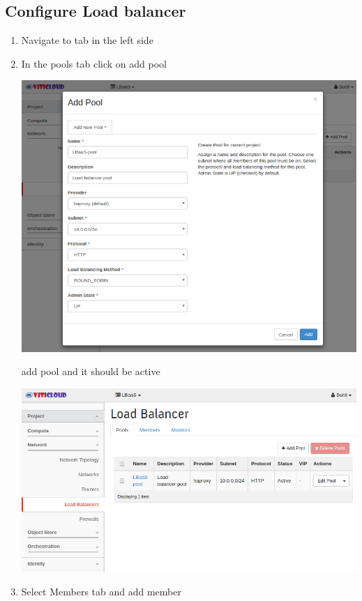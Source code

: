 \documentclass[letterpaper,10pt,english]{sphinxmanual}
\begin{document}
\subsection{Configure Load balancer}
\label{_source/projects/project2:configure-load-balancer}\begin{enumerate}
\item {} 
Navigate to  tab in the left side

\item {} 
In the pools tab click on add pool

\includegraphics{lbaas_add_pool.png}

add pool and it should be active

\includegraphics{lbaas_pool.png}

\item {} 
Select Members tab and add member


\end{enumerate}
\end{document}
